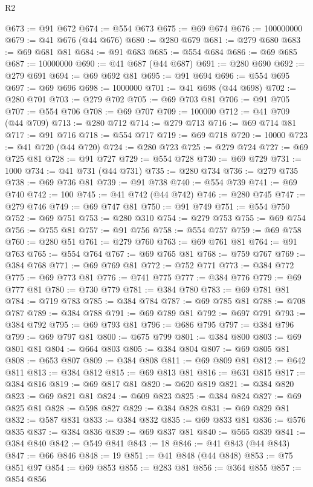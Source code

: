 \begin{lexlean}{R2}
\begin{coremodule}
{{{{{{{{{{{{{{{{{{{{{{{{{{{{{{{{{{{{{{{{{{{{{{@673 := @91 @672
@674 := @554 @673
@675 := @69 @674
@676 := 100000000
@679 := @41 @676 (@44 @676)
@680 := @280 @679
@681 := @279 @680
@683 := @69 @681 @81
@684 := @91 @683
@685 := @554 @684
@686 := @69 @685
@687 := 10000000
@690 := @41 @687 (@44 @687)
@691 := @280 @690
@692 := @279 @691
@694 := @69 @692 @81
@695 := @91 @694
@696 := @554 @695
@697 := @69 @696
@698 := 1000000
@701 := @41 @698 (@44 @698)
@702 := @280 @701
@703 := @279 @702
@705 := @69 @703 @81
@706 := @91 @705
@707 := @554 @706
@708 := @69 @707
@709 := 100000
@712 := @41 @709 (@44 @709)
@713 := @280 @712
@714 := @279 @713
@716 := @69 @714 @81
@717 := @91 @716
@718 := @554 @717
@719 := @69 @718
@720 := 10000
@723 := @41 @720 (@44 @720)
@724 := @280 @723
@725 := @279 @724
@727 := @69 @725 @81
@728 := @91 @727
@729 := @554 @728
@730 := @69 @729
@731 := 1000
@734 := @41 @731 (@44 @731)
@735 := @280 @734
@736 := @279 @735
@738 := @69 @736 @81
@739 := @91 @738
@740 := @554 @739
@741 := @69 @740
@742 := 100
@745 := @41 @742 (@44 @742)
@746 := @280 @745
@747 := @279 @746
@749 := @69 @747 @81
@750 := @91 @749
@751 := @554 @750
@752 := @69 @751
@753 := @280 @310
@754 := @279 @753
@755 := @69 @754
@756 := @755 @81
@757 := @91 @756
@758 := @554 @757
@759 := @69 @758
@760 := @280 @51
@761 := @279 @760
@763 := @69 @761 @81
@764 := @91 @763
@765 := @554 @764
@767 := @69 @765 @81
@768 := @759 @767
@769 := @384 @768
@771 := @69 @769 @81
@772 := @752 @771
@773 := @384 @772
@775 := @69 @773 @81
@776 := @741 @775
@777 := @384 @776
@779 := @69 @777 @81
@780 := @730 @779
@781 := @384 @780
@783 := @69 @781 @81
@784 := @719 @783
@785 := @384 @784
@787 := @69 @785 @81
@788 := @708 @787
@789 := @384 @788
@791 := @69 @789 @81
@792 := @697 @791
@793 := @384 @792
@795 := @69 @793 @81
@796 := @686 @795
@797 := @384 @796
@799 := @69 @797 @81
@800 := @675 @799
@801 := @384 @800
@803 := @69 @801 @81
@804 := @664 @803
@805 := @384 @804
@807 := @69 @805 @81
@808 := @653 @807
@809 := @384 @808
@811 := @69 @809 @81
@812 := @642 @811
@813 := @384 @812
@815 := @69 @813 @81
@816 := @631 @815
@817 := @384 @816
@819 := @69 @817 @81
@820 := @620 @819
@821 := @384 @820
@823 := @69 @821 @81
@824 := @609 @823
@825 := @384 @824
@827 := @69 @825 @81
@828 := @598 @827
@829 := @384 @828
@831 := @69 @829 @81
@832 := @587 @831
@833 := @384 @832
@835 := @69 @833 @81
@836 := @576 @835
@837 := @384 @836
@839 := @69 @837 @81
@840 := @565 @839
@841 := @384 @840
@842 := @549 @841
@843 := 18
@846 := @41 @843 (@44 @843)
@847 := @66 @846
@848 := 19
@851 := @41 @848 (@44 @848)
@853 := @75 @851 @97
@854 := @69 @853
@855 := @283 @81
@856 := @364 @855
@857 := @854 @856
}}}}}}}}}}}}}}}}}}}}}}}}}}}}}}}}}}}}}}}}}}}}}}
\end{coremodule}
\end{lexlean}
